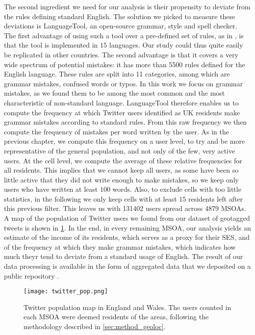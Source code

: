 \documentclass[../thesis.tex]{subfiles}
\begin{document}
The second ingredient we need for our analysis is their propensity to deviate from the
rules defining standard English. The solution we picked to measure these deviations is
LanguageTool, an open-source grammar, style and spell checker. The first advantage of
using such a tool over a pre-defined set of rules, as in
\cite{AbitbolSocioeconomicDependencies2018}, is that the tool is implemented in $15$
languages. Our study could thus quite easily be replicated in other countries. The
second advantage is that it covers a very wide spectrum of potential mistakes: it has
more than \SI{5500}{} rules defined for the English language. These rules are split into
11 categories, among which are grammar mistakes, confused words or typos. In this work
we focus on grammar mistakes, as we found them to be among the most common and the most
characteristic of non-standard language. LanguageTool therefore enables us to compute
the frequency at which Twitter users identified as UK residents make grammar mistakes
according to standard rules. From this raw frequency we then compute the frequency of
mistakes per word written by the user. As in the previous chapter, we compute this
frequency on a user level, to try and be more representative of the general population,
and not only of the few, very active users. At the cell level, we compute the average of
these relative frequencies for all residents. This implies that we cannot keep all
users, as some have been so little active that they did not write enough to make
mistakes, so we keep only users who have written at least $100$ words. Also, to exclude
cells with too little statistics, in the following we only keep cells with at least $15$
residents left after this previous filter. This leaves us with \SI{131402}{} users
spread across \SI{4879}{} \acp{MSOA}. A map of the population of Twitter users we found
from our dataset of geotagged tweets is shown in \cref{fig:EW_twitter_pop}. In the end,
in every remaining \ac{MSOA}, our analysis yields an estimate of the income of its
residents, which serves as a proxy for their \ac{SES}, and of the frequency at which
they make grammar mistakes, which indicates how much theyr tend to deviate from a
standard usage of English. The result of our data processing is available in the form of
aggregated data that we deposited on a public repository
\cite{LoufFrequencyDetected2023}.
\begin{figure}
\centering
  \texttt{[image: twitter\_pop.png]}
  \caption{Twitter population map in England and Wales. The users counted in each
  \ac{MSOA} were deemed residents of the areas, following the methodology described in
  \cref{sec:method_geoloc}.}
  \label{fig:EW_twitter_pop}
\end{figure}
\end{document}
